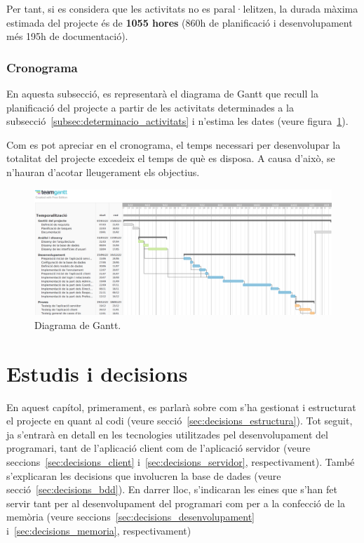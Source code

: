 \documentclass[a4paper,12pt]{ThesisStyle}
\begin{document}
Per tant, si es considera que les activitats no es paral·lelitzen, la durada màxima estimada del projecte és de \textbf{1055 hores} (860h de planificació i desenvolupament més 195h de documentació).

\newpage

\begin{landscape}

\subsection{Cronograma}
\label{subsec:cronograma}

En aquesta subsecció, es representarà el diagrama de Gantt que recull la planificació del projecte a partir de les activitats determinades a la subsecció~\ref{subsec:determinacio_activitats} i n'estima les dates (veure figura~\ref{img:diagrama_gantt}).

Com es pot apreciar en el cronograma, el temps necessari per desenvolupar la totalitat del projecte excedeix el temps de què es disposa. A causa d'això, se n'hauran d'acotar lleugerament els objectius.

\begin{figure}[H]
  \centering
  \includegraphics[width=1.5\textwidth]{assets/planification_figs/ganttDiagram.png}
  \caption{\label{img:diagrama_gantt}Diagrama de Gantt.}
\end{figure}

\end{landscape}

\chapter{Estudis i decisions}
\label{cap:estudi}

En aquest capítol, primerament, es parlarà sobre com s'ha gestionat i estructurat el projecte en quant al codi (veure secció~\ref{sec:decisions_estructura}). Tot seguit, ja s'entrarà en detall en les tecnologies utilitzades pel desenvolupament del programari, tant de l'aplicació client com de l'aplicació servidor (veure seccions~\ref{sec:decisions_client} i~\ref{sec:decisions_servidor}, respectivament). També s'explicaran les decisions que involucren la base de dades (veure secció~\ref{sec:decisions_bdd}). En darrer lloc, s'indicaran les eines que s'han fet servir tant per al desenvolupament del programari com per a la confecció de la memòria (veure seccions~\ref{sec:decisions_desenvolupament} i~\ref{sec:decisions_memoria}, respectivament)
\end{document}
